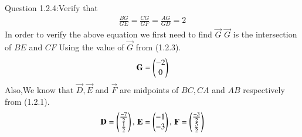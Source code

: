 \documentclass[journal,12pt,twocolumn]{IEEEtran}
\theoremstyle{remark}
\begin{document}
%
Question 1.2.4:Verify that 
\begin{align}
		\frac{BG}{GE} = 
		\frac{CG}{GF} =
		\frac{AG}{GD} = 2 
\end{align}
\fi
\solution In order to verify the above equation we first need to find $\vec{G}$ 
$\vec{G}$ is the intersection of $BE$ and $CF$
Using the value of $\vec{G}$ from (1.2.3).
\begin{align}
		\mathbf{G} = \begin{pmatrix}-2 \\ 0\end{pmatrix}
\end{align}
Also,We know that $\vec{D}, \vec{E}$ and $\vec{F}$ are midpoints of $BC, CA$ and $AB$ respectively from (1.2.1).
\begin{align}
		\mathbf{D} = \begin{pmatrix}\frac{-7}{2} \\ \frac{1}{2}\end{pmatrix},\,
		\mathbf{E} = \begin{pmatrix}-1 \\ -3\end{pmatrix},\,
		\mathbf{F} = \begin{pmatrix}\frac{-3}{2} \\ \frac{5}{2}\end{pmatrix}
\end{align}
\end{document}
